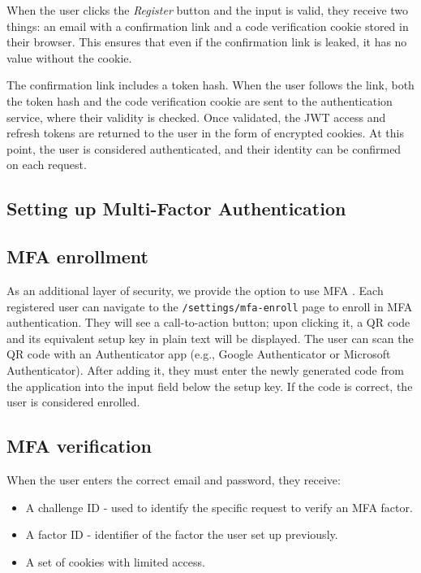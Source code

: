 When the user clicks the \textit{Register} button and the input is valid, they receive two things: an email with a confirmation link and a code verification cookie stored in their browser.
This ensures that even if the confirmation link is leaked, it has no value without the cookie.

The confirmation link includes a token hash. When the user follows the link, both the token hash and the code verification cookie are sent to the authentication service, where their validity is checked. Once validated, the JWT access and refresh tokens are returned to the user in the form of encrypted cookies.
At this point, the user is considered authenticated, and their identity can be confirmed on each request.

\subsection*{Setting up Multi-Factor Authentication}

\subsection*{MFA enrollment}
As an additional layer of security, we provide the option to use MFA \cite{microsoft-mfa}. Each registered user
can navigate to the \texttt{/settings/mfa-enroll} page to enroll in MFA authentication. They will see a call-to-action button; upon clicking it, a QR code and its equivalent setup key in plain text will be displayed.
The user can scan the QR code with an Authenticator app (e.g., Google Authenticator or Microsoft Authenticator). After adding it, they must enter the newly generated code from the application into the input field below the setup key. If the code is correct, the user is considered enrolled.

\subsection*{MFA verification}

When the user enters the correct email and password, they receive:

\begin{itemize}
  \item A challenge ID - used to identify the specific request to verify an MFA factor.
  \item A factor ID - identifier of the factor the user set up previously.
  \item A set of cookies with limited access.
\end{itemize}

